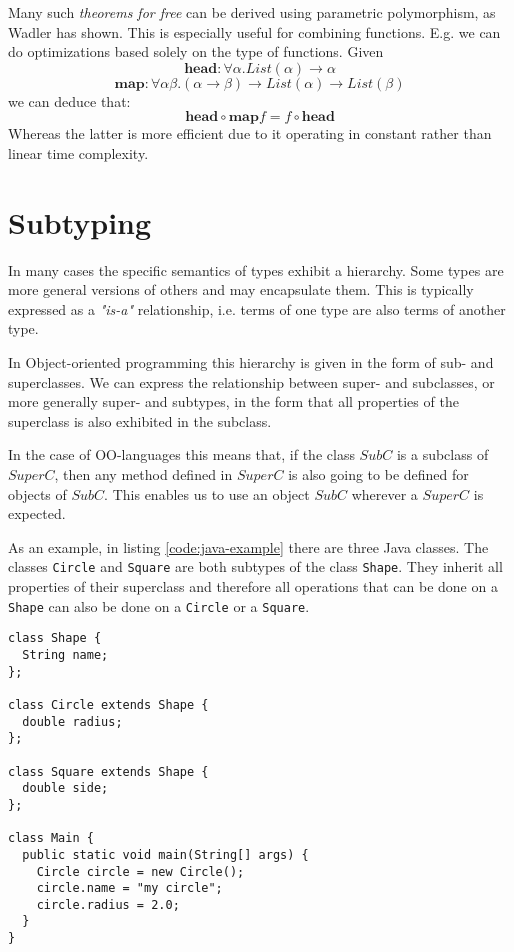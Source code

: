 Many such \emph{theorems for free} can be derived using parametric polymorphism, as Wadler has shown. \cite{wadlertheorems}
This is especially useful for combining functions.
E.g. we can do optimizations based solely on the type of functions.
Given
$$\mathbf{head}  : \forall \alpha. \mathit{List}(\alpha) \to \alpha$$
$$\mathbf{map} : \forall \alpha \beta. (\alpha \to \beta) \to \mathit{List}(\alpha) \to \mathit{List}(\beta)$$
we can deduce that: $$\mathbf{head} \circ \mathbf{map} f = f \circ \mathbf{head}$$
Whereas the latter is more efficient due to it operating in constant rather than linear time complexity.

\section{Subtyping}\label{sec:subtyping}

In many cases the specific semantics of types exhibit a hierarchy.
Some types are more general versions of others and may encapsulate them.
This is typically expressed as a \emph{"is-a"} relationship, i.e. terms of one type are also terms of another type.

In Object-oriented programming this hierarchy is given in the form of sub- and superclasses.
We can express the relationship between super- and subclasses, or more generally super- and subtypes,
in the form that all properties of the superclass is also exhibited in the subclass. \cite{subtyping}

In the case of OO-languages this means that, if the class $\mathit{SubC}$ is a subclass of $\mathit{SuperC}$,
then any method defined in $\mathit{SuperC}$ is also going to be defined for objects of $\mathit{SubC}$.
This enables us to use an object $\mathit{SubC}$ wherever a $\mathit{SuperC}$ is expected.

As an example, in listing \ref{code:java-example} there are three Java classes.
The classes \texttt{Circle} and \texttt{Square} are both subtypes of the class \texttt{Shape}.
They inherit all properties of their superclass and therefore all operations that can be done on a \texttt{Shape} can also be done on a \texttt{Circle} or a \texttt{Square}.

\begin{code}
\label{code:java-example}
\begin{verbatim}
class Shape {
  String name;
};

class Circle extends Shape {
  double radius;
};

class Square extends Shape {
  double side;
};

class Main {
  public static void main(String[] args) {
    Circle circle = new Circle();
    circle.name = "my circle";
    circle.radius = 2.0;
  }
}
\end{verbatim}
\end{code}

